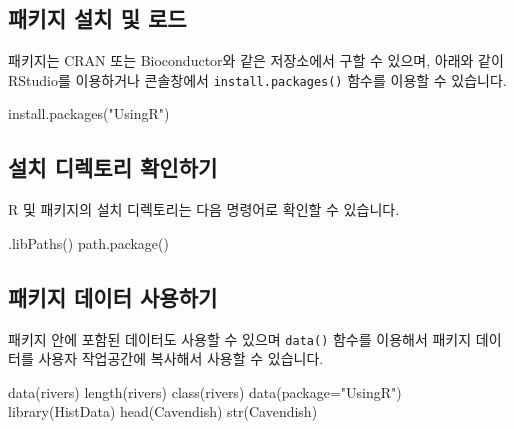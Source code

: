 \documentclass[
  a4paper,
]{book}
\newenvironment{Shaded}{\begin{snugshade}}{\end{snugshade}}
\newcommand{\AttributeTok}[1]{\textcolor[rgb]{0.40,0.45,0.13}{#1}}
\newcommand{\FunctionTok}[1]{\textcolor[rgb]{0.28,0.35,0.67}{#1}}
\newcommand{\NormalTok}[1]{\textcolor[rgb]{0.00,0.23,0.31}{#1}}
\newcommand{\StringTok}[1]{\textcolor[rgb]{0.13,0.47,0.30}{#1}}
\begin{document}
\hypertarget{uxd328uxd0a4uxc9c0-uxc124uxce58-uxbc0f-uxb85cuxb4dc}{%
\subsection{패키지 설치 및
로드}\label{uxd328uxd0a4uxc9c0-uxc124uxce58-uxbc0f-uxb85cuxb4dc}}

패키지는 CRAN 또는 Bioconductor와 같은 저장소에서 구할 수 있으며, 아래와
같이 RStudio를 이용하거나 콘솔창에서 \texttt{install.packages()} 함수를
이용할 수 있습니다.

\begin{Shaded}
\begin{Highlighting}[]
\FunctionTok{install.packages}\NormalTok{(}\StringTok{"UsingR"}\NormalTok{)}
\end{Highlighting}
\end{Shaded}

\hypertarget{uxc124uxce58-uxb514uxb809uxd1a0uxb9ac-uxd655uxc778uxd558uxae30}{%
\subsection{설치 디렉토리
확인하기}\label{uxc124uxce58-uxb514uxb809uxd1a0uxb9ac-uxd655uxc778uxd558uxae30}}

R 및 패키지의 설치 디렉토리는 다음 명령어로 확인할 수 있습니다.

\begin{Shaded}
\begin{Highlighting}[]
\FunctionTok{.libPaths}\NormalTok{()}
\FunctionTok{path.package}\NormalTok{()}
\end{Highlighting}
\end{Shaded}

\hypertarget{uxd328uxd0a4uxc9c0-uxb370uxc774uxd130-uxc0acuxc6a9uxd558uxae30}{%
\subsection{패키지 데이터
사용하기}\label{uxd328uxd0a4uxc9c0-uxb370uxc774uxd130-uxc0acuxc6a9uxd558uxae30}}

패키지 안에 포함된 데이터도 사용할 수 있으며 \texttt{data()} 함수를
이용해서 패키지 데이터를 사용자 작업공간에 복사해서 사용할 수 있습니다.

\begin{Shaded}
\begin{Highlighting}[]
\FunctionTok{data}\NormalTok{(rivers)}
\FunctionTok{length}\NormalTok{(rivers)}
\FunctionTok{class}\NormalTok{(rivers)}
\FunctionTok{data}\NormalTok{(}\AttributeTok{package=}\StringTok{"UsingR"}\NormalTok{)}
\FunctionTok{library}\NormalTok{(HistData)}
\FunctionTok{head}\NormalTok{(Cavendish)}
\FunctionTok{str}\NormalTok{(Cavendish)}
\end{Highlighting}
\end{Shaded}
\end{document}
